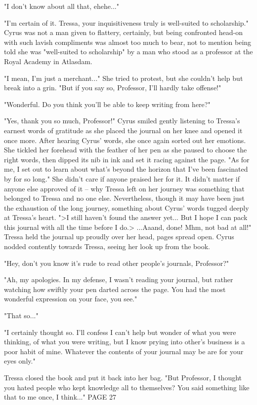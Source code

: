 "I don't know about all that, ehehe..."

"I'm certain of it. Tressa, your inquisitiveness truly is well-suited to scholarship." Cyrus was not a man given to flattery, certainly, but being confronted head-on with such lavish compliments was almost too much to bear, not to mention being told she was "well-suited to scholarship" by a man who stood as a professor at the Royal Academy in Atlasdam.

"I mean, I'm just a merchant..." She tried to protest, but she couldn't help but break into a grin. "But if you say so, Professor, I'll hardly take offense!"

"Wonderful. Do you think you'll be able to keep writing from here?"

"Yes, thank you so much, Professor!" Cyrus smiled gently listening to Tressa's earnest words of gratitude as she placed the journal on her knee and opened it once more. After hearing Cyrus' words, she once again sorted out her emotions. She tickled her forehead with the feather of her pen as she paused to choose the right words, then dipped its nib in ink and set it racing against the page. "As for me, I set out to learn about what's beyond the horizon that I've been fascinated by for so long." She didn't care if anyone praised her for it. It didn't matter if anyone else approved of it -- why Tressa left on her journey was something that belonged to Tressa and no one else. Nevertheless, though it may have been just the exhaustion of the long journey, something about Cyrus' words tugged deeply at Tressa's heart. ">I still haven't found the answer yet... But I hope I can pack this journal with all the time before I do.> ...Aaand, done! Mhm, not bad at all!" Tressa held the journal up proudly over her head, pages spread open. Cyrus nodded contently towards Tressa, seeing her look up from the book.

"Hey, don't you know it's rude to read other people's journals, Professor?"

"Ah, my apologies. In my defense, I wasn't reading your journal, but rather watching how swiftly your pen darted across the page. You had the most wonderful expression on your face, you see."

"That so..."

"I certainly thought so. I'll confess I can't help but wonder of what you were thinking, of what you were writing, but I know prying into other's business is a poor habit of mine. Whatever the contents of your journal may be are for your eyes only."

Tressa closed the book and put it back into her bag. "But Professor, I thought you hated people who kept knowledge all to themselves? You said something like that to me once, I think..." PAGE 27
